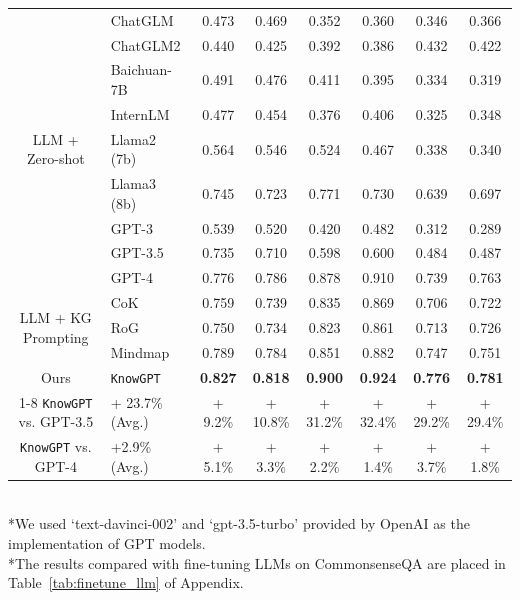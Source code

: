 \documentclass{article}
\theoremstyle{boldremark}
\begin{document}
\begin{table}[thp]
\begin{tabular}{clcccccc}
        \multirow{9}{*}{LLM + Zero-shot}
        &ChatGLM &0.473 &0.469&0.352 &0.360 &0.346 &0.366\\
        &ChatGLM2 &0.440 &0.425 &0.392 &0.386 &0.432 &0.422 \\
        &Baichuan-7B & 0.491 & 0.476 &0.411 &0.395 &0.334 &0.319\\
        &InternLM &0.477  &0.454  &0.376 &0.406 &0.325 & 0.348\\
        &Llama2 (7b) &0.564 &0.546 &0.524 & 0.467&0.338 &0.340 \\
        &Llama3 (8b) &0.745 &0.723 &0.771 &0.730 &0.639 &0.697 \\
        &GPT-3 &0.539 &0.520 &0.420 &0.482 &0.312 &0.289 \\
        &GPT-3.5 &0.735 &0.710 &0.598 &0.600 &0.484 &0.487 \\
        &GPT-4 &0.776 &0.786 &0.878 &0.910 &0.739 &0.763 \\ 
        \midrule
        \multirow{3}{*}{LLM + KG Prompting }
        &CoK &0.759 &0.739 &0.835 &0.869 &0.706 &0.722 \\
         &RoG &0.750&0.734 &0.823 &0.861 &0.713 &0.726 \\
        & Mindmap & 0.789& 0.784 &0.851 &0.882 &0.747 &0.751\\
        \midrule
        Ours
        &\texttt{KnowGPT} &\textbf{0.827} &\textbf{0.818} &\textbf{0.900} &\textbf{0.924} &\textbf{0.776} &\textbf{0.781} \\\cmidrule(lr){1-8}
        \texttt{KnowGPT} vs. GPT-3.5
        &+ 23.7\% (Avg.) &+ 9.2\% &+ 10.8\% &+ 31.2\% &+ 32.4\% &+ 29.2\% &+ 29.4\% \\
        \texttt{KnowGPT} vs. GPT-4
        &+2.9\% (Avg.) & + 5.1\%&+ 3.3\% &+ 2.2\% &+ 1.4\% &+ 3.7\% &+ 1.8\% \\   
    \bottomrule
	\end{tabular}	
 \vspace{1mm}\\
 \footnotesize{*We used `text-davinci-002' and `gpt-3.5-turbo' provided by OpenAI as the implementation of GPT models.\\
 *The results compared with fine-tuning LLMs on CommonsenseQA  are placed in Table~\ref{tab:finetune_llm} of Appendix.\\}
 \vspace{-5mm}
\end{table}
\end{document}
